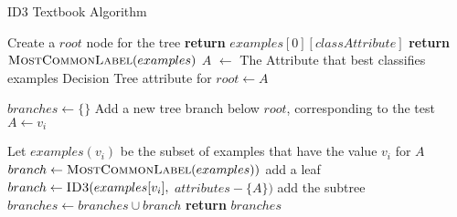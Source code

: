 \begin{algorithm}[t]
\caption{ID3 Textbook Algorithm }\label{a:id3-simple}
\begin{algorithmic}[1]
    \State Create a $root$ node for the tree
        \State \textbf{return} $examples[0][classAttribute]$
        \State \textbf{return} $\textsc{MostCommonLabel}(examples)$
    \EndIf
    \State $A$ $\gets$ The Attribute that best classifies examples
    \State Decision Tree attribute for $root \gets A$

    \State $branches \gets \{\}$
        \State Add a new tree branch below $root$, corresponding to the test $A \gets v_i$

        \State Let $examples(v_i)$ be the subset of examples that have the value $v_i$ for $A$
            \State $branch \gets \textsc{MostCommonLabel}(examples))$ add a leaf
        \Else
            \State $branch \gets \textsc{ID3}(examples[v_i],$ $attributes - \{A\})$ add the subtree
        \EndIf
        \State $branches \gets branches \cup branch$
    \EndFor
    \State \textbf{return} $branches$
\EndProcedure
\end{algorithmic}
\end{algorithm}


